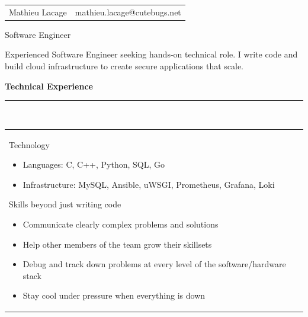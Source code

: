 \documentclass[a4paper,12pt]{article}
\newcommand{\ligne}[1]{\rule[0.5ex]{\textwidth}{#1}\\}
\newcommand{\styleRub}[1]{\textbf{\large #1}\par}
\newcommand{\indentStd}{\noindent\hspace*{10pt}}
\newenvironment{rubrique}[2][\linewidth]%
{\styleRub{#2}%
\ligne{0.5mm}
\setlength{\lenB}{#1}%
\setlength{\lenC}{\linewidth}%
\addtolength{\lenC}{-\lenA}%
\addtolength{\lenC}{-\lenB}%
\addtolength{\lenC}{-19pt}
\indentStd\begin{tabular}[t]{p{\lenB}p{\lenC}}}
{\end{tabular}}
\newlength{\lenA} %
\newlength{\lenB} %
\newlength{\lenC} %
\begin{document}
\begin{tabular*}{1\textwidth}{@{\extracolsep{\fill}}lr}
Mathieu Lacage & mathieu.lacage@cutebugs.net\\
\end{tabular*}

\vspace{1cm}
\begin{center}{\huge Software Engineer}\end{center}

\begin{center}
Experienced Software Engineer seeking hands-on technical role.\newline
        I write code and build cloud infrastructure to create
secure applications that scale.
\end{center}

\vspace{1cm}
\begin{rubrique}{Technical Experience}

Technology
\begin{itemize}
\item Languages: C, C++, Python, SQL, Go
\item Infrastructure: MySQL, Ansible, uWSGI, Prometheus, Grafana, Loki
\end{itemize}

Skills beyond just writing code
\begin{itemize}
\item Communicate clearly complex problems and solutions
\item Help other members of the team grow their skillsets
\item Debug and track down problems at every level of the software/hardware stack
\item Stay cool under pressure when everything is down
\end{itemize}

\end{rubrique}
\end{document}
